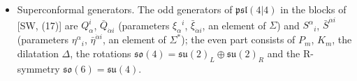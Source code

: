 \begin{remark}
\begin{itemize}
\item Superconformal generators. The odd generators of $\mathfrak{psl}(4|4)$ in the blocks of [SW, (17)] are $Q^i_\alpha$, $\bar Q_{\dot\alpha i}$ (parameters $\xi_\alpha{}^i$, $\bar\xi_{\dot\alpha i}$, an element of $\Sigma$) and $S^\alpha{}_i$, $\bar S^{\dot\alpha i}$ (parameters $\eta^\alpha{}_i$, $\bar\eta^{\dot\alpha i}$, an element of $\Sigma^*$); the even part consists of $P_m$, $K_m$, the dilatation $\Delta$, the rotations $\mathfrak{so}(4)=\mathfrak{su}(2)_L\oplus\mathfrak{su}(2)_R$ and the R-symmetry $\mathfrak{so}(6)=\mathfrak{su}(4)$.
\end{itemize}
\end{remark}
